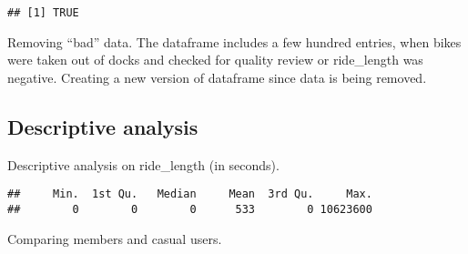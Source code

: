 \documentclass[
]{article}
\newenvironment{Shaded}{\begin{snugshade}}{\end{snugshade}}
\newcommand{\AttributeTok}[1]{\textcolor[rgb]{0.13,0.29,0.53}{#1}}
\newcommand{\DecValTok}[1]{\textcolor[rgb]{0.00,0.00,0.81}{#1}}
\newcommand{\FunctionTok}[1]{\textcolor[rgb]{0.13,0.29,0.53}{\textbf{#1}}}
\newcommand{\NormalTok}[1]{#1}
\newcommand{\OtherTok}[1]{\textcolor[rgb]{0.56,0.35,0.01}{#1}}
\newcommand{\SpecialCharTok}[1]{\textcolor[rgb]{0.81,0.36,0.00}{\textbf{#1}}}
\newcommand{\StringTok}[1]{\textcolor[rgb]{0.31,0.60,0.02}{#1}}
\begin{document}
\begin{verbatim}
## [1] TRUE
\end{verbatim}

Removing ``bad'' data. The dataframe includes a few hundred entries,
when bikes were taken out of docks and checked for quality review or
ride\_length was negative. Creating a new version of dataframe since
data is being removed.

\begin{Shaded}
\end{Shaded}

\hypertarget{descriptive-analysis}{%
\subsection{Descriptive analysis}\label{descriptive-analysis}}

Descriptive analysis on ride\_length (in seconds).

\begin{Shaded}
\end{Shaded}

\begin{verbatim}
##     Min.  1st Qu.   Median     Mean  3rd Qu.     Max. 
##        0        0        0      533        0 10623600
\end{verbatim}

Comparing members and casual users.

\begin{Shaded}
\end{Shaded}
\end{document}
